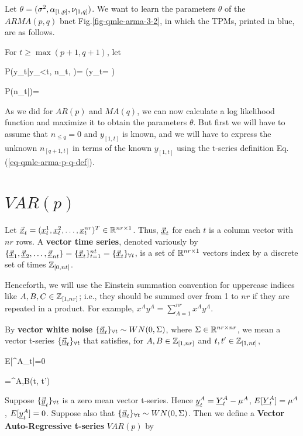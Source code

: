Let $\theta=(\sigma^2,\alpha_{[1,p]}, \nu_{[1,q]})$.
We want to learn the parameters
$\theta$
of the $ARMA(p,q)$ bnet Fig.\ref{fig-qmle-arma-3-2},
in which the TPMs, printed in blue,
are as follows.

For $t\geq
\max(p+1, q+1)$, let

\beq\color{blue}
P(y_t|y_{<t}, n_{\leq t}, \theta)=
\indi\left(y_t=
\right)
\eeq

\beq\color{blue}
P(n_t|\theta)=
{\s\sqrt{2\pi}}
\exp{}
\eeq


As we did for
$AR(p)$ and $MA(q)$,
we can  now calculate
a log likelihood
function and
maximize it to obtain the
parameters $\theta$.
But first we
will have to assume
that $n_{\leq q}=0$
and $y_{[1,t]}$ is
known,
and we will
have to express
the unknown $n_{[q+1,t]}$
in terms of the known $y_{[1, t]}$
using the t-series definition
Eq.(\ref{eq-qmle-arma-p-q-def}).

\section{$VAR(p)$}
\label{sec-var-p}

Let
$\vec{{\underline{x}}}_t=({\underline{x}}_{t}^1,
{\underline{x}}_{t}^2, \ldots, {\underline{x}}_t^{nr})^T
\in { \mathbb{R}}^{nr\times 1}$. Thus,
 $\vec{{\underline{x}}}_t$
for each $t$ is a
column vector with $nr$ rows.
A {\bf vector time series}, denoted
variously by
$\{\vec{{\underline{x}}}_1, \vec{{\underline{x}}}_2, \ldots,
\vec{{\underline{x}}}_{nt}\}
=\{\vec{{\underline{x}}}_t\}_{t=1}^{nt}
={\{\vec{{\underline{x}}}_t\}_{\forall t}}$,
is a set of ${ \mathbb{R}}^{nr\times1}$ vectors
index by a discrete set of times ${\mathbb{Z}}_{[0, nt]}$.


Henceforth, we will use the Einstein
summation convention
for uppercase
indices like $A, B, C\in {\mathbb{Z}}_{[1,nr]}$; i.e.,
they should be summed over
from 1 to $nr$
if they are repeated in a product.
For example, $x^A y^A =\sum_{A=1}^{nr}x^A y^A$.

By {\bf vector white noise}
${\{\vec{{\underline{n}}}_t\}_{\forall t}}\sim WN(0, \Sigma)$,
where $\Sigma\in { \mathbb{R}}^{nr\times nr}$,
we mean a vector t-series
${\{\vec{{\underline{n}}}_t\}_{\forall t}}$ that satisfies,
for
$A,B\in {\mathbb{Z}}_{[1,nr]}$
and $t,t'\in {\mathbb{Z}}_{[1,nt]}$,


\beq
E[\rvn^A_t]=0
\eeq

\beq
{}=\Sigma^{A,B}\delta(t, t')
\eeq

Suppose ${\{\vec{{\underline{y}}}_t\}_{\forall t}}$
is a zero mean vector
 t-series.
Hence
${\underline{y}}_t^A= {\underline{Y}}_t^A-\mu^A$,
$E[{\underline{Y}}_t^A]=\mu^A$,
$E[{\underline{y}}_t^A]=0$.
Suppose also that
${\{\vec{{\underline{n}}}_t\}_{\forall t}}\sim WN(0, \Sigma)$.
Then we define a
{\bf Vector
Auto-Regressive
t-series} $VAR(p)$ by

